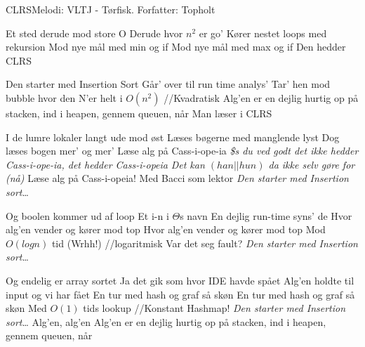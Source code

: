 \begin{sang}{CLRS}{Melodi: VLTJ - Tørfisk. Forfatter: Topholt}
    \begin{vers}
    Et sted derude mod store O
    Derude hvor $n^2$ er go'
    Kører nestet loops med rekursion
    Mod nye mål med min og if
    Mod nye mål med max og if
    Den hedder CLRS
    \end{vers}
    
    \begin{omkvaed}
    Den starter med Insertion Sort
    Går' over til run time analys'
    Tar' hen mod bubble hvor den N'er helt i $O(n^2)$ //Kvadratisk
    Alg'en er en dejlig hurtig op på stacken, ind i heapen, gennem queuen, når
    Man læser i CLRS
    \end{omkvaed}
    
    \begin{vers}
    I de lumre lokaler langt ude mod øst
    Læses bøgerne med manglende lyst
    Dog læses bogen mer' og mer'
    Læse alg på Cass-i-ope-ia
    \textit{\$s du ved godt det ikke hedder Cass-i-ope-ia, det hedder Cass-i-opeia}
    \textit{Det kan $(han||hun)$ da ikke selv gøre for (nå)}
    Læse alg på Cass-i-opeia!
    Med Bacci som lektor
    \emph{Den starter med Insertion sort}\ldots
    \end{vers}
    
    \begin{vers}
    Og boolen kommer ud af loop
    Et i-n i $\Theta$s navn
    En dejlig run-time syns' de
    Hvor alg'en vender og kører mod top
    Hvor alg'en vender og kører mod top
    Mod $O(log n)$ tid (Wrhh!) //logaritmisk
    Var det seg fault?
    \emph{Den starter med Insertion sort}\ldots
    \end{vers}

    \begin{vers}
    Og endelig er array sortet
    Ja det gik som hvor IDE havde spået
    Alg'en holdte til input og vi har fået
    En tur med hash og graf så skøn
    En tur med hash og graf så skøn
    Med $O(1)$ tids lookup //Konstant
    Hashmap!
    \emph{Den starter med Insertion sort}\ldots
    Alg'en, alg'en
    Alg'en er en dejlig hurtig op på stacken, ind i heapen, gennem queuen, når
    \end{vers}
\end{sang}